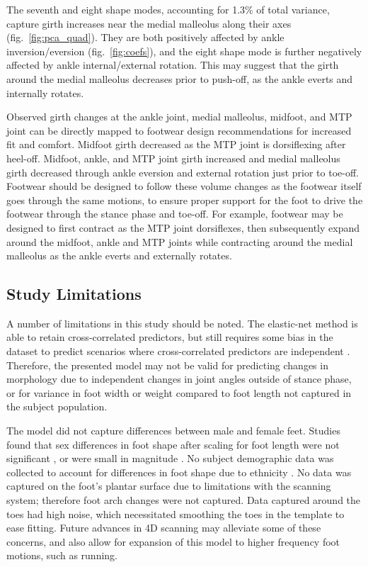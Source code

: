 \documentclass[defaultstyle,11pt]{comps}
\begin{document}
The seventh and eight shape modes, accounting for 1.3\% of total variance, capture girth increases near the medial malleolus along their axes (fig.~\ref{fig:pca_quad}).
They are both positively affected by ankle inversion/eversion (fig.~\ref{fig:coefs}), and the eight shape mode is further negatively affected by ankle internal/external rotation.
This may suggest that the girth around the medial malleolus decreases prior to push-off, as the ankle everts and internally rotates.

Observed girth changes at the ankle joint, medial malleolus, midfoot, and MTP joint can be directly mapped to footwear design recommendations for increased fit and comfort. Midfoot girth decreased as the MTP joint is dorsiflexing after heel-off.
Midfoot, ankle, and MTP joint girth increased and medial malleolus girth decreased through ankle eversion and external rotation just prior to toe-off.
Footwear should be designed to follow these volume changes as the footwear itself goes through the same motions, to ensure proper support for the foot to drive the footwear through the stance phase and toe-off.
For example, footwear may be designed to first contract as the MTP joint dorsiflexes, then subsequently expand around the midfoot, ankle and MTP joints while contracting around the medial malleolus as the ankle everts and externally rotates.

\hypertarget{study-limitations}{%
\subsection{Study Limitations}\label{study-limitations}}

A number of limitations in this study should be noted.
The elastic-net method is able to retain cross-correlated predictors, but still requires some bias in the dataset to predict scenarios where cross-correlated predictors are independent \citep{Zou2005}.
Therefore, the presented model may not be valid for predicting changes in morphology due to independent changes in joint angles outside of stance phase, or for variance in foot width or weight compared to foot length not captured in the subject population.

The model did not capture differences between male and female feet.
Studies found that sex differences in foot shape after scaling for foot length were not significant \citep{Kouchi2009, Barisch-Fritz2014a, Conrad2019}, or were small in magnitude \citep{Wunderlich2001, Krauss2008}.
No subject demographic data was collected to account for differences in foot shape due to ethnicity \citep{Jurca2019}.
No data was captured on the foot's plantar surface due to limitations with the scanning system; therefore foot arch changes were not captured.
Data captured around the toes had high noise, which necessitated smoothing the toes in the template to ease fitting.
Future advances in 4D scanning may alleviate some of these concerns, and also allow for expansion of this model to higher frequency foot motions, such as running.
\end{document}
